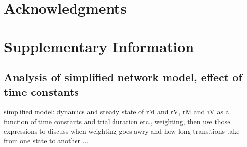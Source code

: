 \documentclass[10pt,a4paper,draft]{article}
\begin{document}
%

\section*{Acknowledgments}
%







\newpage
\section*{Supplementary Information}
\appendix


\subsection*{Analysis of simplified network model, effect of time constants}

simplified model: dynamics and steady state of rM and rV, rM and rV as a function of time constants and trial duration etc., weighting, then use those expressions to discuss when weighting goes awry and how long transitions take from one state to another ...
\end{document}
